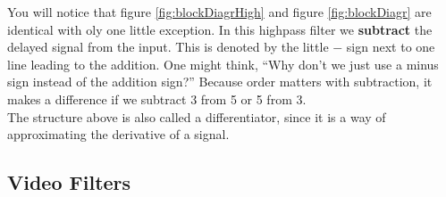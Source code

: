 You will notice that figure \ref{fig:blockDiagrHigh} and figure \ref{fig:blockDiagr} are identical with oly one little exception. In this highpass filter we \textbf{subtract} the delayed signal from the input. This is denoted by the little $-$ sign next to one line leading to the addition. One might think, ``Why don't we just use a minus sign instead of the addition sign?'' Because order matters with subtraction, it makes a difference if we subtract 3 from 5 or 5 from 3.\\
The structure above is also called a differentiator, since it is a way of approximating the derivative of a signal.





\subsection{Video Filters}

